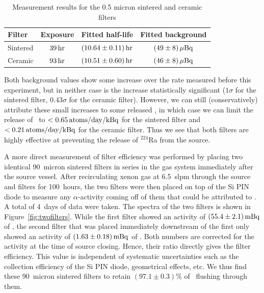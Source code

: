 \documentclass[phys,dissertation]{puthesis}
\begin{document}
\begin{table}[htb]
\centering
\caption{Measurement results for the 0.5 micron sintered and ceramic filters}
\label{tab:filter_limits}
\renewcommand{\arraystretch}{1.2}
\begin{tabular}{|lccc|}
\hline\hline
Filter & Exposure & Fitted half-life & Fitted background \\ \hline
Sintered & $39\,\mathrm{hr}$ & $(10.64\pm0.11)\,\mathrm{hr}$ & $(49\pm8)\,\mathrm{\mu Bq}$\\
Ceramic & $93\,\mathrm{hr}$ & $(10.51\pm0.60)\,\mathrm{hr}$ & $(46\pm8)\,\mathrm{\mu Bq}$\\
\hline\hline
\end{tabular}
\end{table}

Both background values show some increase over the rate measured before this experiment, but in neither case is the increase statistically significant ($1\sigma$ for the sintered filter, $0.43\sigma$ for the ceramic filter). However, we can still (conservatively) attribute these small increases to some released \Ra, in which case we can limit the release of \Ra~to $<0.65\,\mathrm{atoms/day/kBq}$ for the sintered filter and $<0.21\,\mathrm{atoms/day/kBq}$ for the ceramic filter. Thus we see that both filters are highly effective at preventing the release of $^{224}$Ra from the source.

A more direct measurement of filter efficiency was performed by placing two identical 90~micron sintered filters in series in the gas system immediately after the source vessel. After recirculating xenon gas at 6.5~slpm through the source and filters for 100~hours, the two filters were then placed on top of the Si PIN diode to measure any $\alpha$-activity coming off of them that could be attributed to \Ra. A total of 4~days of data were taken. The spectra of the two filters is shown in Figure~\ref{fig:twofilters}. While the first filter showed an activity of $(55.4\pm2.1)\,\mathrm{mBq}$ of \Ra, the second filter that was placed immediately downstream of the first only showed an activity of $(1.63\pm0.18)\,\mathrm{mBq}$ of \Ra. Both numbers are corrected for the activity at the time of source closing. Hence, their ratio directly gives the filter efficiency. This value is independent of systematic uncertainties such as the collection efficiency of the Si PIN diode, geometrical effects, etc. We thus find these 90~micron sintered filters to retain $(97.1\pm0.3)$\% of \Ra~flushing through them.
\end{document}
